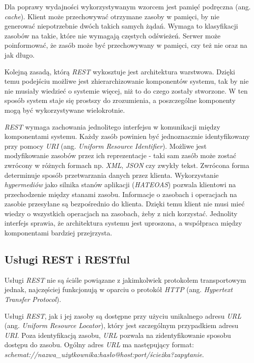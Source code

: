 Dla poprawy wydajności wykorzystywanym wzorcem jest pamięć podręczna (ang. \textsl{cache}). Klient może przechowywać otrzymane zasoby w pamięci, by nie generować niepotrzebnie dwóch takich samych żądań. Wymaga to klasyfikacji zasobów na takie, które nie wymagają częstych odświeżeń. Serwer może poinformować, że zasób może być przechowywany w pamięci, czy też nie oraz na jak długo.  

Kolejną zasadą, którą \textsl{REST} wykosztuje jest architektura warstwowa. Dzięki temu podejściu możliwe jest zhierarchizowanie komponentów systemu, tak by nie nie musiały wiedzieć o systemie więcej, niż to do czego zostały stworzone. W ten sposób system staje się prostszy do zrozumienia, a poszczególne komponenty mogą być wykorzystywane wielokrotnie.

\textsl{REST} wymaga zachowania jednolitego interfejsu w komunikacji między komponentami systemu. Każdy zasób powinien być jednoznacznie identyfikowany przy pomocy \textsl{URI} (ang. \textsl{Uniform Resource Identifier}). Możliwe jest modyfikowanie zasobów przez ich reprezentacje - taki sam zasób może zostać zwrócony w różnych formach np. \textsl{XML}, \textsl{JSON} czy zwykły tekst. Zwrócona forma determinuje sposób przetwarzania danych przez klienta. Wykorzystanie  \textsl{hypermediów} jako silnika stanów aplikacji (\textsl{HATEOAS}) pozwala klientowi na przechodzenie między stanami zasobu. Informacje o  zasobach i operacjach na zasobie przesyłane są bezpośrednio do klienta. Dzięki temu klient nie musi mieć wiedzy o wszystkich operacjach na zasobach, żeby z nich korzystać. Jednolity interfejs sprawia, że architektura systemu jest uproszona, a współpraca między komponentami bardziej przejrzysta.
 
\subsection{Usługi REST i RESTful}
Usługi \textsl{REST} nie są ściśle powiązane z jakimkolwiek protokołem transportowym jednak, najczęściej funkcjonują w oparciu o protokół \textsl{HTTP} (ang. \textsl{Hypertext Transfer Protocol}).

Usługi \textsl{REST}, jak i jej zasoby są dostępne przy użyciu unikalnego adresu \textsl{URL} (ang. \textsl{Uniform Resource Locator}), który jest szczególnym przypadkiem adresu \textsl{URI}. Poza identyfikacją zasobu, \textsl{URL} pozwala na zidentyfikowanie sposobu dostępu do zasobu. Ogólny adres \textsl{URL} ma następujący format: \\ \textsl{schemat://nazwa\_użytkownika:hasło@host:port/ścieżka?zapytanie}. 

